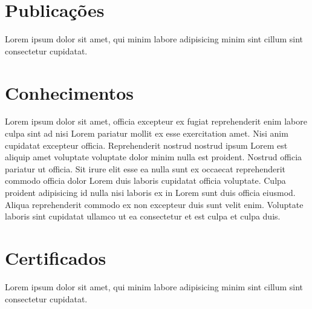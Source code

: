 \documentclass[11pt]{article}
\begin{document}
\section*{Publicações}

Lorem ipsum dolor sit amet, qui minim labore adipisicing minim sint cillum sint consectetur cupidatat.

\section*{Conhecimentos}

Lorem ipsum dolor sit amet, officia excepteur ex fugiat reprehenderit enim labore culpa sint ad nisi Lorem pariatur mollit ex esse exercitation amet. Nisi anim cupidatat excepteur officia. Reprehenderit nostrud nostrud ipsum Lorem est aliquip amet voluptate voluptate dolor minim nulla est proident. Nostrud officia pariatur ut officia. Sit irure elit esse ea nulla sunt ex occaecat reprehenderit commodo officia dolor Lorem duis laboris cupidatat officia voluptate. Culpa proident adipisicing id nulla nisi laboris ex in Lorem sunt duis officia eiusmod. Aliqua reprehenderit commodo ex non excepteur duis sunt velit enim. Voluptate laboris sint cupidatat ullamco ut ea consectetur et est culpa et culpa duis.

\section*{Certificados}

Lorem ipsum dolor sit amet, qui minim labore adipisicing minim sint cillum sint consectetur cupidatat.
\end{document}
